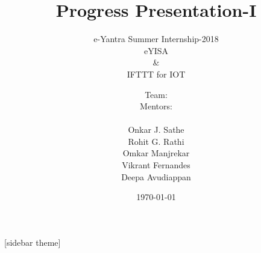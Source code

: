 \documentclass[10pt, a4paper]{beamer}
\begin{document}
	\title{Progress Presentation-I}
	\subtitle{e-Yantra Summer Internship-2018
	\vspace{0.1cm}
	\\ eYISA
	\\\&
	\\IFTTT for IOT}
	\author{
		\begin{minipage}[b]{0.40\textwidth}
			\raggedleft
			\hspace{2.2cm}
			Team:
			\newline
			\vspace{0.28cm}
			\\\hspace{1.95cm}Mentors:
			\newline\\\vspace{0.45cm}
		\end{minipage}%
		\begin{minipage}[b]{0.60\textwidth}
			\raggedright
			Onkar J. Sathe
			\\Rohit G. Rathi			
			\vspace{0.3cm}
			\\Omkar Manjrekar
			\\Vikrant Fernandes
			\\Deepa Avudiappan
		\end{minipage}%
	}
	\date{\today}
	\frame{\titlepage}

[sidebar theme]
\end{document}
